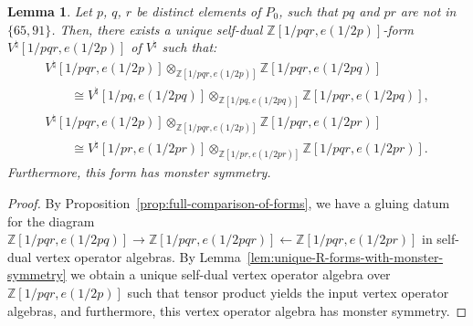 \documentclass[pdftex]{sigma}
\newcommand{\bZ}{\mathbb{Z}}
\newtheorem{lem}[thm]{Lemma}
\theoremstyle{definition}
\begin{document}
\begin{lem} \label{lem:descent-for-three-primes}Let $p$, $q$, $r$ be distinct elements of $P_0$, such that $pq$ and $pr$ are not in $\{65, 91 \}$. Then, there exists a unique self-dual $\bZ[1/pqr, e(1/2p)]$-form $V^\natural[1/pqr, e(1/2p)]$ of $V^\natural$ such that:
\begin{gather*}
V^\natural[1/pqr, e(1/2p)] \otimes_{\bZ[1/pqr, e(1/2p)]} \bZ[1/pqr, e(1/2pq)] \\
\qquad{} \cong V^\natural[1/pq, e(1/2pq)] \otimes_{\bZ[1/pq, e(1/2pq)]} \bZ[1/pqr, e(1/2pq)], \\
V^\natural[1/pqr, e(1/2p)] \otimes_{\bZ[1/pqr, e(1/2p)]} \bZ[1/pqr, e(1/2pr)] \\
\qquad{} \cong V^\natural[1/pr, e(1/2pr)] \otimes_{\bZ[1/pr, e(1/2pr)]} \bZ[1/pqr, e(1/2pr)].
\end{gather*}
Furthermore, this form has monster symmetry.
\end{lem}
\begin{proof}By Proposition~\ref{prop:full-comparison-of-forms}, we have a gluing datum for the diagram $\bZ[1/pqr, e(1/2pq)] \to \bZ[1/pqr, e(1/2pqr)] \leftarrow \bZ[1/pqr, e(1/2pr)]$ in self-dual vertex operator algebras. By Lemma~\ref{lem:unique-R-forms-with-monster-symmetry} we obtain a unique self-dual vertex operator algebra over $\bZ[1/pqr,e(1/2p)]$ such that tensor product yields the input vertex operator algebras, and furthermore, this vertex operator algebra has monster symmetry.
\end{proof}
\end{document}
